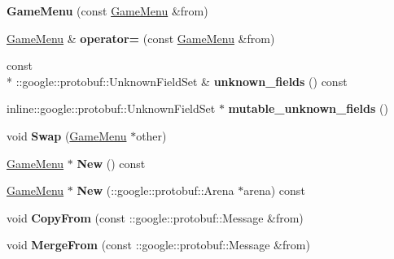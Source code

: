 \begin{DoxyCompactItemize}
\item 
\hypertarget{class_game_menu_a0a1b44357508921c4f6edee476abb7b1}{{\bfseries Game\-Menu} (const \hyperlink{class_game_menu}{Game\-Menu} \&from)}\label{class_game_menu_a0a1b44357508921c4f6edee476abb7b1}

\item 
\hypertarget{class_game_menu_aaaf4f50a1d43e387811424fb4b09f93e}{\hyperlink{class_game_menu}{Game\-Menu} \& {\bfseries operator=} (const \hyperlink{class_game_menu}{Game\-Menu} \&from)}\label{class_game_menu_aaaf4f50a1d43e387811424fb4b09f93e}

\item 
\hypertarget{class_game_menu_a1eaa869160e0897331da0ec3c015fec6}{const \\*
\-::google\-::protobuf\-::\-Unknown\-Field\-Set \& {\bfseries unknown\-\_\-fields} () const }\label{class_game_menu_a1eaa869160e0897331da0ec3c015fec6}

\item 
\hypertarget{class_game_menu_a4092f328998bb9659d48903db1243b07}{inline\-::google\-::protobuf\-::\-Unknown\-Field\-Set $\ast$ {\bfseries mutable\-\_\-unknown\-\_\-fields} ()}\label{class_game_menu_a4092f328998bb9659d48903db1243b07}

\item 
\hypertarget{class_game_menu_a8ecb2f60b010cbf56bf1f1c1756fd4cf}{void {\bfseries Swap} (\hyperlink{class_game_menu}{Game\-Menu} $\ast$other)}\label{class_game_menu_a8ecb2f60b010cbf56bf1f1c1756fd4cf}

\item 
\hypertarget{class_game_menu_a44324114e8f5f3497fbff764ffbaec66}{\hyperlink{class_game_menu}{Game\-Menu} $\ast$ {\bfseries New} () const }\label{class_game_menu_a44324114e8f5f3497fbff764ffbaec66}

\item 
\hypertarget{class_game_menu_aa42d2be609f8e769b721b39d7857f1ea}{\hyperlink{class_game_menu}{Game\-Menu} $\ast$ {\bfseries New} (\-::google\-::protobuf\-::\-Arena $\ast$arena) const }\label{class_game_menu_aa42d2be609f8e769b721b39d7857f1ea}

\item 
\hypertarget{class_game_menu_a13d4e96e0878e9bc0f848bcc4a5c9775}{void {\bfseries Copy\-From} (const \-::google\-::protobuf\-::\-Message \&from)}\label{class_game_menu_a13d4e96e0878e9bc0f848bcc4a5c9775}

\item 
\hypertarget{class_game_menu_a82f6ca7995e5bc16aa40e02cc35226f3}{void {\bfseries Merge\-From} (const \-::google\-::protobuf\-::\-Message \&from)}\label{class_game_menu_a82f6ca7995e5bc16aa40e02cc35226f3}


\end{DoxyCompactItemize}
